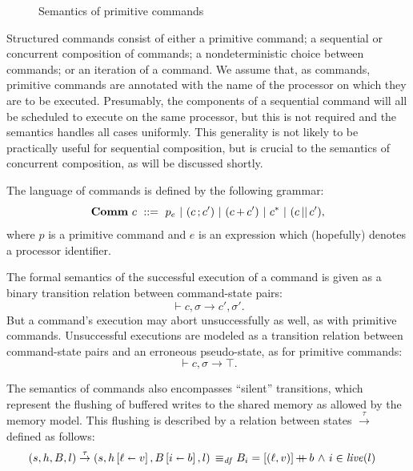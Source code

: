\documentclass[11pt]{article}
\begin{document}
\begin{figure}[p]
\begin{minipage}{\columnwidth}
		\vspace{1em}

		
		\vspace{1em}

		
		\vspace{1em}

	\end{minipage}
	\caption{\label{fig:primitive-semantics} Semantics of primitive commands}
\end{figure}

Structured commands consist of either a primitive command; a sequential or concurrent composition of commands; a nondeterministic choice between commands; or an iteration of a command. We assume that, as commands, primitive commands are annotated with the name of the processor on which they are to be executed. Presumably, the components of a sequential command will all be scheduled to execute on the same processor, but this is not required and the semantics handles all cases uniformly. This generality is not likely to be practically useful for sequential composition, but is crucial to the semantics of concurrent composition, as will be discussed shortly. 

The language of commands is defined by the following grammar: \[ \mathbf{Comm}~c ~::=~ p_e ~|~ (c \operatorname{;} c') ~|~ (c \operatorname{+} c') ~|~ c^{\operatorname{\ast}} ~|~ (c \operatorname{||} c'),\] where $p$ is a primitive command and $e$ is an expression which (hopefully) denotes a processor identifier.  

The formal semantics of the successful execution of a command is given as a binary transition relation between command-state pairs: \[ \vdash c,\sigma \rightarrow c',\sigma'.\] But a command's execution may abort unsuccessfully as well, as with primitive commands. Unsuccessful executions are modeled as a transition relation between command-state pairs and an erroneous pseudo-state, as for primitive commands: \[ \vdash c,\sigma \rightarrow \top. \] 

The semantics of commands also encompasses ``silent'' transitions, which represent the flushing of buffered writes to the shared memory as allowed by the memory model. This flushing is described by a relation between states $\stackrel{\tau}{\rightarrow}$ defined as follows: \begin{align*} (s,h,B,l) \stackrel{\tau}{\rightarrow} (s,h \left[ \ell \shortleftarrow v \right],B \left[ i \shortleftarrow b \right],l) \operatorname{\;\equiv_{\mathit{df}}\;} & B_i = \left[(\ell,v)\right] \operatorname{+\!\!\!+} b \operatorname{\,\wedge\,} i \in \mathit{live}(l) 
\end{align*} 
\end{document}
